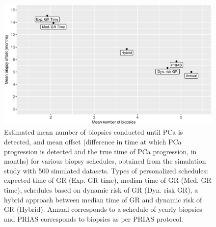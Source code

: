         \clearpage
    \begin{figure}
    \centerline{\includegraphics[width=\columnwidth]{../images/sim_study/meanNbVsOffset_all.eps}}
    \caption{Estimated mean number of biopsies conducted until PCa is detected, and mean offset (difference in time at which PCa progression is detected and the true time of PCa progression, in months) for various biopsy schedules, obtained from the simulation study with 500 simulated datasets. Types of personalized schedules: expected time of GR (Exp. GR time), median time of GR (Med. GR time), schedules based on dynamic risk of GR (Dyn. risk GR), a hybrid approach between median time of GR and dynamic risk of GR (Hybrid). Annual corresponds to a schedule of yearly biopsies and PRIAS corresponds to biopsies as per PRIAS protocol.}
    \label{fig : meanNbVsOffset}
    \end{figure}

